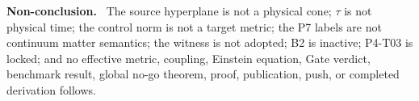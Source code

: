 \documentclass[11pt]{article}
\newenvironment{nonconclusion}{\par\smallskip\noindent\textbf{Non-conclusion.}\ }{\par\smallskip}
\begin{document}
\begin{nonconclusion}
The source hyperplane is not a physical cone; \(\tau\) is not physical time;
the control norm is not a target metric; the P7 labels are not continuum
matter semantics; the witness is not adopted; B2 is inactive; P4-T03 is
locked; and no effective metric, coupling, Einstein equation, Gate verdict,
benchmark result, global no-go theorem, proof, publication, push, or completed
derivation follows.
\end{nonconclusion}
\end{document}
